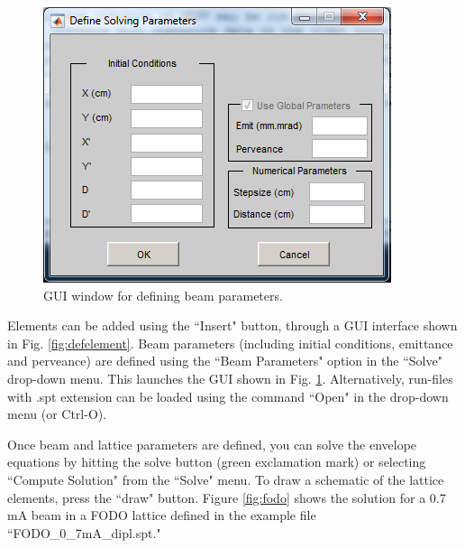 \documentclass[../menv_main.tex]{subfiles}
\begin{document}
\begin{figure}
\centering
\includegraphics{figures/defparam_window.png}
\caption{GUI window for defining beam parameters.}
\label{fig:defparam}
\end{figure}


Elements can be added using the ``Insert" button, through a GUI interface shown in Fig. \ref{fig:defelement}. Beam parameters (including initial conditions, emittance and perveance) are defined using the ``Beam Parameters" option in the ``Solve" drop-down menu. This launches the GUI shown in Fig. \ref{fig:defparam}. Alternatively, run-files with .spt extension can be loaded using the command ``Open" in the drop-down menu (or Ctrl-O). 

Once beam and lattice parameters are defined, you can solve the envelope equations by hitting the solve button (green exclamation mark) or selecting ``Compute Solution" from the ``Solve" menu. To draw a schematic of the lattice elements, press the ``draw" button. 
Figure \ref{fig:fodo} shows the solution for a 0.7 mA beam in a FODO lattice defined in the example file ``FODO\_0\_7mA\_dipl.spt." 
\end{document}
